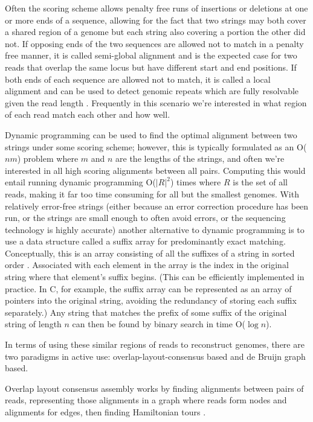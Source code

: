 \documentclass[doctor]{thesis}
\begin{document}
Often the scoring scheme allows penalty free runs of insertions or deletions at one or more ends of a sequence, allowing for the fact that two strings may both cover a shared region of a genome but each string also covering a portion the other did not.
If opposing ends of the two sequences are allowed not to match in a penalty free manner, it is called semi-global alignment and is the expected case for two reads that overlap the same locus but have different start and end positions.
If both ends of each sequence are allowed not to match, it is called a local alignment and can be used to detect genomic repeats which are fully resolvable given the read length \cite{smith1981identification}.
Frequently in this scenario we're interested in what region of each read match each other and how well.

Dynamic programming can be used to find the optimal alignment between two strings under some scoring scheme; however, this is typically formulated as an O($nm$) problem where $m$ and $n$ are the lengths of the strings, and often we're interested in all high scoring alignments between all pairs.  Computing this would entail running dynamic programming O($|R|^2$) times where $R$ is the set of all reads, making it far too time consuming for all but the smallest genomes.
With relatively error-free strings (either because an error correction procedure has been run, or the strings are small enough to often avoid errors, or the sequencing technology is highly accurate) another alternative to dynamic programming is to use a data structure called a suffix array for predominantly exact matching.
Conceptually, this is an array consisting of all the suffixes of a string in sorted order \cite{manber1993suffix}.
Associated with each element in the array is the index in the original string where that element's suffix begins.
(This can be efficiently implemented in practice. In C, for example, the suffix array can be represented as an array of pointers into the original string, avoiding the redundancy of storing each suffix separately.)
Any string that matches the prefix of some suffix of the original string of length $n$ can then be found by binary search in time O($\log n$).  

In terms of using these similar regions of reads to reconstruct genomes, there are two paradigms in active use: overlap-layout-consensus based and de Bruijn graph based.

Overlap layout consensus assembly works by finding alignments between pairs of reads, representing those alignments in a graph where reads form nodes and alignments for edges, then finding Hamiltonian tours \cite{myers1995toward}.  
\end{document}
